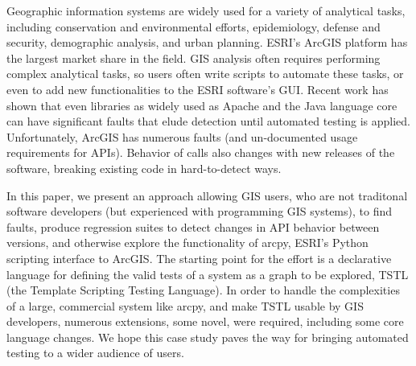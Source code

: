 Geographic information systems are widely used for a variety of
analytical tasks, including conservation and environmental efforts,
epidemiology, defense and security, demographic analysis, and urban
planning.  ESRI's ArcGIS platform has the largest market share in the
field.  GIS analysis often requires performing complex analytical
tasks, so users often write scripts to automate these tasks, or even
to add new functionalities to the ESRI software's GUI.  Recent work
has shown that even libraries as widely used as Apache and the Java
language core can have significant faults that elude detection until
automated testing is applied.  Unfortunately,  
ArcGIS has numerous faults (and un-documented usage requirements for
APIs).  Behavior of calls also changes with new releases of the
software, breaking existing code in hard-to-detect ways.

In this paper, we present an approach allowing GIS users, who are not
traditonal software developers (but experienced with programming GIS
systems), to find faults, produce regression suites to detect changes
in API behavior between versions, and otherwise explore the
functionality of arcpy, ESRI's Python scripting interface to ArcGIS.
The starting point for the effort is a declarative language for
defining the valid tests of a system as a graph to be explored, TSTL
(the Template Scripting Testing Language).  In order to handle the
complexities of a large, commercial system like arcpy, and make TSTL
usable by GIS developers, numerous extensions, some novel, were
required, including some core language changes.  We hope this case
study paves the way for bringing automated testing to a wider
audience of users.
